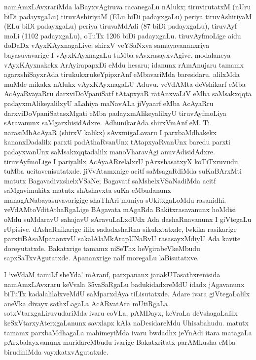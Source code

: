namAmxLAvxrariMda laBayxvAgiruva racanegaLu nAlukx; tiruvirutatxM (nUru biDi padayx\-gaLu) tiruvAshiriyaM (ELu biDi padayxgaLu) periya tiruvAshiriyaM (ELu biDi padayx\-gaLu) periya tiruvaMdAdi (87 biDi padayxgaLu), tiruvAyf moLi (1102 padayx\-gaLu), oTuTx 1206 biDi padayxgaLu. tiruvAyfmoLige aidu doDaDx vAyxKAyxna\-gaLive; shirxV veYSaNxva samayavananxriya bayasuvavarige I vAyxKAyxnagaLu tuMba sAvxrasayx\-vAgive. modalaneya vAyxKAyxnakekx ArAyirapapxDi eMdu hesaru; idanunx rAmAnu\-jaru tamamx agarxshiSayxrAda tirukukxrukeYpipxrAnf eMbavariMda baresidaru. alilxMda muMde mikakx nAlukx vAyxKAyxnagaLU Aduvu. veVdAMta deVshikarf eMba AcAyaRvayaRru darxviDoVpaniSatf tAtapxyaR ratAnxvaLiV eMba saMsakxqqta padayxmAlikeyalilxyU aLahiya maNavALa jiVyaarf eMba AcAyaRru darxviDoVpaniSatasxMgati eMba padayx\-mAlikeyalilxyU tiruvAyfmoLiya sAravanunx saMgarxhisidAdxre. AdhunikarAda shirxVmAnf eM. Ti. narasiMhAcAyaR (shirxV kalikx) sAvxmigaLavaru I parxbaMdhakekx kananxDadalilx parxti padAthaRvanUnx tAtapxyaRvanUnx baredu parxti padayxvanUnx saMsakxqqtadalilx manoVhara\-vAgi anuvAdisidAdxre. tiruvAyfmoLige I pariyalilx AcAyaARrelalxrU pArxshasatxyX koTiTxruvudu tuMba ucitavenisutatxde. jiVvAtamxnige acitf saMsagaRdiMda suKaBArxMti matutx BagavadivxshelxVSaNe; Bagavatf saMshelxVSaNadiMda acitf saMgavimukitx matutx shAshavxta suKa eMbudanunx managANabayasuvavarigige shaThAri muniya sUkitxgaLoMdu rasanidhi. veVdAMtoVditAthaRgaLige BAgavata mAgaRda Bakitxrasavanunx hoMdisi oMdu suMdaravU sahajavU sAravuLaLxdUdx Ada dashaRnavanunx I giVtegaLu rUpisive. dAshaRnikarige ililx sadadxshaRna sikukxtatxde, lwkika rasikarige parxtiBAsaMpananxvU sakalAlaMkArapUNaRvU rasasayxMdiyU Ada kavite doreyutatxde. Bakatxrige tamamx niSeThx heVgirabeVkeMbudu sapxSaTxvAgutatxde. Apananxrige nalf moregaLu laBisutatxve.

I `veVdaM tamiLf sheYda' mAranf, parxpananx janakUTasathxrenisida namAmxLAvxraru keVvala 35vaSaRgaLu badukidadxreMdU idadx jAgavanunx biTuTx kadalalilalxveMdU saMparxdAya
tiLisutatxde. Adare ivara giVtegaLalilx aneVka divayx sathxLagaLa AcARvatAra mUtiRgaLa sotxVtarxgaLiruvudariMda ivaru coVLa, pAMDayx, keVraLa deVshagaLalilx keSxVtarxyAterxgaLanunx savxlapx kAla naDesidareMdu Uhisabahudu. matutx tamamx parxbaMdhagaLa mahimeyiMda ivaru bwdadhx jeYnAdi itara matagaLa pArxbalayxvanunx muridareMbudu ivarige Bakatxritatx parAMkusha eMba birudiniMda vayxkatxvAgutatxde.


